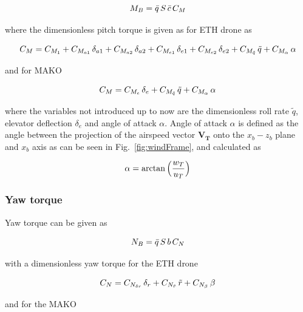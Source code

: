 \begin{equation}{\label{eqn:pitchTorque}}
M_B = \bar{q} \, S \, \bar{c} \, C_M
\end{equation}

where the dimensionless pitch torque is given as for ETH drone as

\begin{equation}{\label{eqn:bigCraftC_M}}
C_M = C_{M_{1}} + C_{M_{a1}} \, \delta_{a1} + C_{M_{a2}} \, \delta_{a2} + C_{M_{e1}} \, \delta_{e1} + C_{M_{e2}} \, \delta_{e2} + C_{M_{\tilde{q}}} \, \tilde{q} +  C_{M_\alpha} \, \alpha 
\end{equation}

and for MAKO

\begin{equation}{\label{eqn:makoC_M}}
C_M =  C_{M_{e}} \, \delta_{e} + C_{M_{\tilde{q}}} \, \tilde{q} +  C_{M_\alpha} \, \alpha 
\end{equation}

where the variables not introduced up to now are the dimensionless roll rate $\tilde{q}$, elevator deflection $\delta_{e}$ and angle of attack $\alpha$. Angle of attack $\alpha$ is defined as the angle between the projection of the airspeed vector $\bm{V_T}$ onto the $x_b-z_b$ plane and $x_b$ axis as can be seen in Fig.~\ref{fig:windFrame}, and calculated as

\begin{equation}{\label{eqn:angleOfAttack}}
\alpha = \arctan{\Big( \frac{w_T}{u_T} \Big)}
\end{equation}

\subsubsection{Yaw torque}

Yaw torque can be given as

\begin{equation}{\label{eqn:yawTorque}}
N_B = \bar{q} \, S \, b \, C_N \\
\end{equation}

with a dimensionless yaw torque for the ETH drone

\begin{equation}{\label{eqn:bigCraftC_N}}
C_N= C_{N_{\delta r}} \, \delta_{r} + C_{N_{\tilde{r}}} \, \tilde{r} +  C_{N_\beta} \, \beta 
\end{equation}

and for the MAKO

